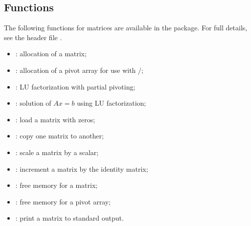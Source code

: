 \subsection{Functions}
The following functions for  matrices are available
in the {\dense} package.  For full details, see the header file .
\begin{itemize}
\item {}: allocation of a  matrix;
\item {}: allocation of a pivot array for use
  with /;
\item {}: LU factorization with partial pivoting;
\item {}: solution of $Ax = b$ using LU factorization;
\item {}: load a matrix with zeros;
\item {}: copy one matrix to another;
\item {}: scale a matrix by a scalar;
\item {}: increment a matrix by the identity matrix;
\item {}: free memory for a  matrix;
\item {}: free memory for a pivot array;
\item {}: print a  matrix to standard output.
\end{itemize}

